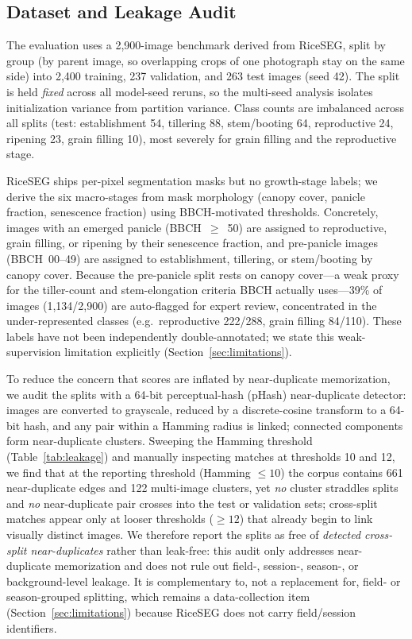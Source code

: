 \documentclass{llncs}
\begin{document}
\subsection{Dataset and Leakage Audit}

The evaluation uses a 2{,}900-image benchmark derived from RiceSEG, split by group (by parent image, so overlapping crops of one photograph stay on the same side) into 2{,}400 training, 237 validation, and 263 test images (seed 42). The split is held \emph{fixed} across all model-seed reruns, so the multi-seed analysis isolates initialization variance from partition variance. Class counts are imbalanced across all splits (test: establishment 54, tillering 88, stem/booting 64, reproductive 24, ripening 23, grain filling 10), most severely for grain filling and the reproductive stage.

RiceSEG ships per-pixel segmentation masks but no growth-stage labels; we derive the six macro-stages from mask morphology (canopy cover, panicle fraction, senescence fraction) using BBCH-motivated thresholds. Concretely, images with an emerged panicle (BBCH~$\ge$~50) are assigned to reproductive, grain filling, or ripening by their senescence fraction, and pre-panicle images (BBCH~00--49) are assigned to establishment, tillering, or stem/booting by canopy cover. Because the pre-panicle split rests on canopy cover---a weak proxy for the tiller-count and stem-elongation criteria BBCH actually uses---39\% of images (1{,}134/2{,}900) are auto-flagged for expert review, concentrated in the under-represented classes (e.g.\ reproductive 222/288, grain filling 84/110). These labels have not been independently double-annotated; we state this weak-supervision limitation explicitly (Section~\ref{sec:limitations}).

To reduce the concern that scores are inflated by near-duplicate memorization, we audit the splits with a 64-bit perceptual-hash (pHash) near-duplicate detector: images are converted to grayscale, reduced by a discrete-cosine transform to a 64-bit hash, and any pair within a Hamming radius is linked; connected components form near-duplicate clusters. Sweeping the Hamming threshold (Table~\ref{tab:leakage}) and manually inspecting matches at thresholds 10 and 12, we find that at the reporting threshold (Hamming $\le 10$) the corpus contains 661 near-duplicate edges and 122 multi-image clusters, yet \emph{no} cluster straddles splits and \emph{no} near-duplicate pair crosses into the test or validation sets; cross-split matches appear only at looser thresholds ($\ge 12$) that already begin to link visually distinct images. We therefore report the splits as free of \emph{detected cross-split near-duplicates} rather than leak-free: this audit only addresses near-duplicate memorization and does not rule out field-, session-, season-, or background-level leakage. It is complementary to, not a replacement for, field- or season-grouped splitting, which remains a data-collection item (Section~\ref{sec:limitations}) because RiceSEG does not carry field/session identifiers.
\end{document}
